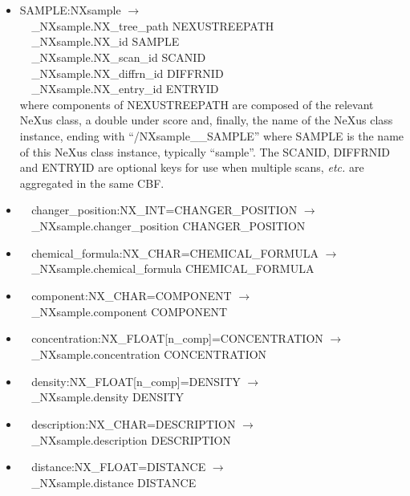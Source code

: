\documentclass[11pt]{article}
\begin{document}
{{\begin{itemize}

\item{SAMPLE:NXsample $\rightarrow$\\
\verb|  |\_NXsample.NX\_tree\_path    NEXUSTREEPATH \\
\verb|  |\_NXsample.NX\_id            SAMPLE\\
\verb|  |\_NXsample.NX\_scan\_id      SCANID \\
\verb|  |\_NXsample.NX\_diffrn\_id    DIFFRNID \\
\verb|  |\_NXsample.NX\_entry\_id     ENTRYID \\
where components of NEXUSTREEPATH are composed of the
relevant NeXus class, a double under score and, finally, the
name of the NeXus class instance, ending with ``/NXsample\_\_SAMPLE''
where SAMPLE is the name of this NeXus class instance, typically ``sample''.
The SCANID, DIFFRNID and ENTRYID are optional keys for use
when multiple scans, {\it etc.} are aggregated in the same CBF.}

\item{\verb|  |changer\_position:NX\_INT=CHANGER\_POSITION $\rightarrow$\\
\verb|  |\_NXsample.changer\_position CHANGER\_POSITION}

\item{\verb|  |chemical\_formula:NX\_CHAR=CHEMICAL\_FORMULA $\rightarrow$\\
\verb|  |\_NXsample.chemical\_formula CHEMICAL\_FORMULA}

\item{\verb|  |component:NX\_CHAR=COMPONENT $\rightarrow$\\
\verb|  |\_NXsample.component COMPONENT}

\item{\verb|  |concentration:NX\_FLOAT[n\_comp]=CONCENTRATION $\rightarrow$\\
\verb|  |\_NXsample.concentration CONCENTRATION}

\item{\verb|  |density:NX\_FLOAT[n\_comp]=DENSITY $\rightarrow$\\
\verb|  |\_NXsample.density DENSITY}

\item{\verb|  |description:NX\_CHAR=DESCRIPTION $\rightarrow$\\
\verb|  |\_NXsample.description DESCRIPTION}

\item{\verb|  |distance:NX\_FLOAT=DISTANCE $\rightarrow$\\
\verb|  |\_NXsample.distance DISTANCE}


\end{itemize}}}
\end{document}

